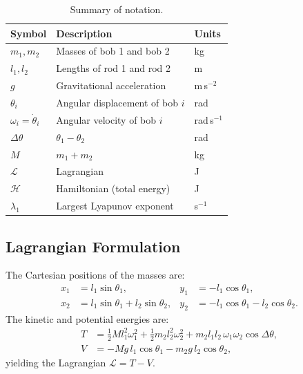 \documentclass[11pt,a4paper]{article}
\newcommand{\Lagr}{\mathcal{L}}
\newcommand{\Ham}{\mathcal{H}}
\begin{document}
\begin{table}[htbp]
\centering
\caption{Summary of notation.}
\label{tab:notation}
\begin{tabular}{@{}lll@{}}
\toprule
\textbf{Symbol} & \textbf{Description} & \textbf{Units} \\
\midrule
$m_1, m_2$       & Masses of bob 1 and bob 2                  & kg       \\
$l_1, l_2$       & Lengths of rod 1 and rod 2                 & m        \\
$g$              & Gravitational acceleration                  & m\,s$^{-2}$ \\
$\theta_i$       & Angular displacement of bob $i$             & rad      \\
$\omega_i = \dot\theta_i$ & Angular velocity of bob $i$        & rad\,s$^{-1}$ \\
$\Delta\theta$   & $\theta_1 - \theta_2$                      & rad      \\
$M$              & $m_1 + m_2$                                 & kg       \\
$\Lagr$          & Lagrangian                                  & J        \\
$\Ham$           & Hamiltonian (total energy)                  & J        \\
$\lambda_1$      & Largest Lyapunov exponent                   & s$^{-1}$ \\
\bottomrule
\end{tabular}
\end{table}

\subsection{Lagrangian Formulation}

The Cartesian positions of the masses are:
\begin{align}
  x_1 &= l_1\sin\theta_1, &
  y_1 &= -l_1\cos\theta_1, \label{eq:cart1}\\
  x_2 &= l_1\sin\theta_1 + l_2\sin\theta_2, &
  y_2 &= -l_1\cos\theta_1 - l_2\cos\theta_2. \label{eq:cart2}
\end{align}
The kinetic and potential energies are:
\begin{align}
  T &= \tfrac{1}{2}M l_1^2\omega_1^2
     + \tfrac{1}{2}m_2 l_2^2\omega_2^2
     + m_2 l_1 l_2\,\omega_1\omega_2\cos\Delta\theta,
     \label{eq:kinetic}\\
  V &= -Mg\,l_1\cos\theta_1 - m_2 g\,l_2\cos\theta_2,
     \label{eq:potential}
\end{align}
yielding the Lagrangian $\Lagr = T - V$.
\end{document}
